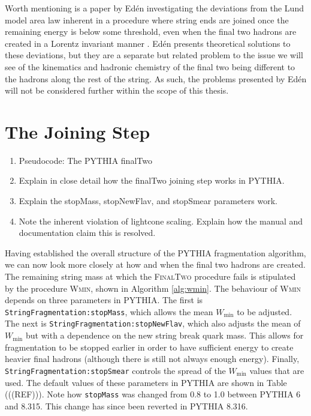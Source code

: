 \documentclass[12pt,a4paper]{report}
\begin{document}
Worth mentioning is a paper by Ed\'en investigating the deviations from the Lund model area law inherent in a procedure where string ends are joined once the remaining energy is below some threshold, even when the final two hadrons are created in a Lorentz invariant manner \cite{Eden:2000in}. Ed\'en presents theoretical solutions to these deviations, but they are a separate but related problem to the issue we will see of the kinematics and hadronic chemistry of the final two being different to the hadrons along the rest of the string. As such, the problems presented by Ed\'en will not be considered further within the scope of this thesis.

\section{The Joining Step}
\begin{enumerate}
\item Pseudocode: The PYTHIA finalTwo
\item Explain in close detail how the finalTwo joining step works in PYTHIA.
\item Explain the stopMass, stopNewFlav, and stopSmear parameters work.
\item Note the inherent violation of lightcone scaling. Explain how the manual and documentation claim this is resolved.
\end{enumerate}

Having established the overall structure of the PYTHIA fragmentation algorithm, we can now look more closely at how and when the final two hadrons are created. The remaining string mass at which the \textsc{FinalTwo} procedure fails is stipulated by the procedure \textsc{Wmin}, shown in Algorithm \ref{alg:wmin}. The behaviour of \textsc{Wmin} depends on three parameters in PYTHIA. The first is \texttt{StringFragmentation:stopMass}, which allows the mean $W_\text{min}$ to be adjusted. The next is \texttt{StringFragmentation:stopNewFlav}, which also adjusts the mean of $W_\text{min}$ but with a dependence on the new string break quark mass. This allows for fragmentation to be stopped earlier in order to have sufficient energy to create heavier final hadrons (although there is still not always enough energy). Finally, \texttt{StringFragmentation:stopSmear} controls the spread of the $W_\text{min}$ values that are used. The default values of these parameters in PYTHIA are shown in Table (((REF))). Note how \texttt{stopMass} was changed from 0.8 to 1.0 between PYTHIA 6 and 8.315. This change has since been reverted in PYTHIA 8.316. 
\end{document}
